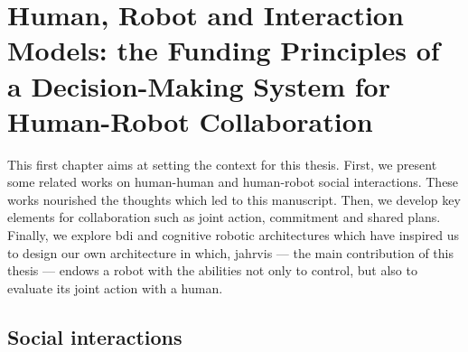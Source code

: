 \documentclass[a4paper,11pt,twoside]{StyleThese}
\begin{document}
\setcounter{chapter}{0} %
\dominitoc
\faketableofcontents
\fi

\chapter{Human, Robot and Interaction Models: the Funding Principles of a Decision-Making System for Human-Robot Collaboration}
\label{chapter:chap1}
\minitoc

This first chapter aims at setting the context for this thesis. First, we present some related works on human-human and human-robot social interactions. These works nourished the thoughts which led to this manuscript. Then, we develop key elements for collaboration such as joint action, commitment and shared plans. Finally, we explore \acrfull{bdi} and cognitive robotic architectures  which have inspired us to design our own architecture in which, \acrshort{jahrvis} —  the main contribution of this thesis — endows a robot with the abilities not only to control, but also to evaluate its joint action with a human. 


\section{Social interactions}\label{chap1:sec:soc_int}
\end{document}
